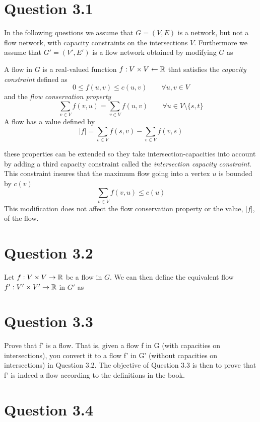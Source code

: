 \documentclass[10pt]{article}
\begin{document}



\section*{Question 3.1} %
\label{sec:question_3_1}
In the following questions we assume that $G = (V,E)$ is a network, but not a flow network, with capacity constraints on the intersections $V$. Furthermore we assume that $G' = (V',E')$ is a flow network obtained by modifying $G$ as 

A flow in $G$ is a real-valued function $f: V \times V \leftarrow \mathbb R$ that satisfies the \emph{capacity constraint} defined as
\begin{equation}
 0 \leq f(u,v) \leq c(u,v) \qquad  \forall u,v \in V
\end{equation}
and the \emph{flow conservation property}
\begin{equation}
\sum_{v \in V} f(v,u) = \sum_{v \in V} f(u,v)  \qquad \forall u \in V \setminus \{s,t\}
\end{equation}
A flow has a value defined by
\begin{equation}
 |f| = \sum_{v \in V} f(s,v) - \sum_{v \in V} f(v,s)
\end{equation}

these properties can be extended so they take intersection-capacities into account by adding a third capacity constraint called the \emph{intersection capacity constraint}. This constraint insures that the maximum flow going into a vertex $u$ is bounded by $c(v)$
\begin{equation}
\sum_{v \in V} f(v,u) \leq c(u) 
\end{equation}
This modification does not affect the flow conservation property or the value, $|f|$, of the flow.



\section*{Question 3.2} %
\label{sec:question_3_2}
Let $f: V \times V \rightarrow \mathbb R$ be a flow in $G$. We can then define the equivalent flow $f': V' \times V' \rightarrow \mathbb R$ in $G'$ as

\section*{Question 3.3} %
\label{sec:question_3_3}
Prove that f' is a flow. That is, given a flow f in G (with capacities on intersections), you convert it to a flow f' in G' (without capacities on intersections) in Question 3.2. The objective of Question 3.3 is then to prove that f' is indeed a flow according to the definitions in the book.

\section*{Question 3.4} %
\label{sec:question_3_4}





\end{document}
